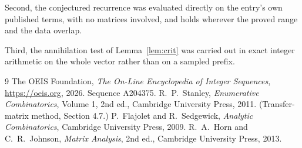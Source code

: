 \documentclass[11pt,a4paper]{article}
\theoremstyle{plain}
\theoremstyle{definition}
\begin{document}
Second, the conjectured recurrence was evaluated directly on the entry's own published terms,
with no matrices involved, and holds wherever the proved range and the data overlap.

Third, the annihilation test of Lemma~\ref{lem:crit} was carried out in exact integer
arithmetic on the whole vector rather than on a sampled prefix.

\begin{thebibliography}{9}
 The OEIS Foundation, \emph{The On-Line Encyclopedia of Integer
Sequences}, \url{https://oeis.org}, 2026. Sequence A204375.
 R.~P.~Stanley, \emph{Enumerative Combinatorics}, Volume 1, 2nd ed.,
Cambridge University Press, 2011. (Transfer-matrix method, Section 4.7.)
 P.~Flajolet and R.~Sedgewick, \emph{Analytic Combinatorics}, Cambridge
University Press, 2009.
 R.~A.~Horn and C.~R.~Johnson, \emph{Matrix Analysis}, 2nd ed., Cambridge
University Press, 2013.
\end{thebibliography}
\end{document}

